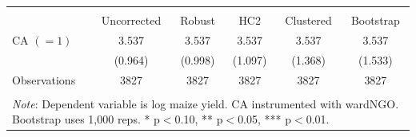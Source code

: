 \begin{tabular}{l*{5}{c}} 
\\[-1.8ex]\hline \hline \\[-1.8ex] 
& \multicolumn{1}{c}{Uncorrected} & 
\multicolumn{1}{c}{Robust} & 
\multicolumn{1}{c}{HC2} & 
\multicolumn{1}{c}{Clustered} & 
\multicolumn{1}{c}{Bootstrap} 
\\ \midrule
\midrule
\hspace{0.1cm} CA $(=1)$&       3.537\sym{***}&       3.537\sym{***}&       3.537\sym{***}&       3.537\sym{***}&       3.537\sym{**} \\
                    &     (0.964)         &     (0.998)         &     (1.097)         &     (1.368)         &     (1.533)         \\
\midrule
Observations        &        3827         &        3827         &        3827         &        3827         &        3827         \\
\hline \hline \\[-1.8ex] 
\multicolumn{6}{p{\linewidth}}{\small 
\noindent \textit{Note}: Dependent variable 
is log maize yield. CA instrumented with 
wardNGO. Bootstrap uses 1,000 reps. 
* p$<$0.10, ** p$<$0.05, *** p$<$0.01.} 
\end{tabular}
